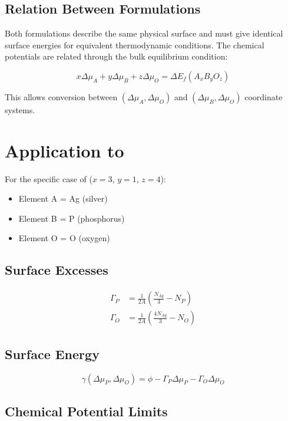 \documentclass[11pt]{article}
\begin{document}
\subsection{Relation Between Formulations}

Both formulations describe the same physical surface and must give identical surface energies for equivalent thermodynamic conditions. The chemical potentials are related through the bulk equilibrium condition:

\begin{equation}
x \Delta\mu_A + y \Delta\mu_B + z \Delta\mu_O = \Delta E_f(A_xB_yO_z)
\end{equation}

This allows conversion between $(\Delta\mu_A, \Delta\mu_O)$ and $(\Delta\mu_B, \Delta\mu_O)$ coordinate systems.

\section{Application to }

For the specific case of  ($x=3$, $y=1$, $z=4$):

\begin{itemize}
\item Element A = Ag (silver)
\item Element B = P (phosphorus)  
\item Element O = O (oxygen)
\end{itemize}

\subsection{Surface Excesses}

\begin{align}
\Gamma_P &= \frac{1}{2A} \left(\frac{N_{Ag}}{3} - N_P\right) \\
\Gamma_O &= \frac{1}{2A} \left(\frac{4 N_{Ag}}{3} - N_O\right)
\end{align}

\subsection{Surface Energy}

\begin{equation}
\gamma(\Delta\mu_P, \Delta\mu_O) = \phi - \Gamma_P \Delta\mu_P - \Gamma_O \Delta\mu_O
\end{equation}

\subsection{Chemical Potential Limits}
\end{document}
